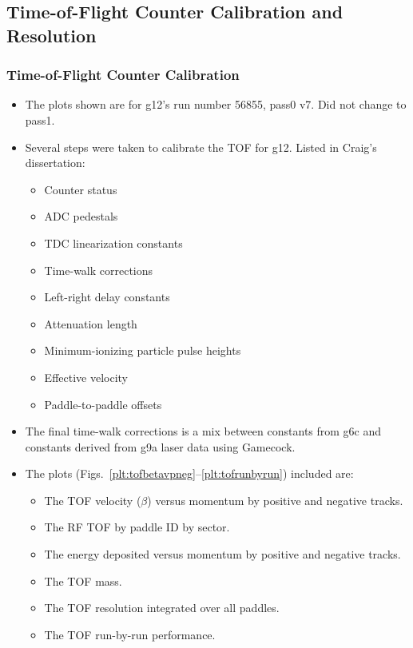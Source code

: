 \subsection{\label{sec:calib.tof}Time-of-Flight Counter Calibration and Resolution}

\subsubsection{\label{sec:calib.tof.calib}Time-of-Flight Counter Calibration}

\begin{itemize}
    \item The plots shown are for g12's run number 56855, pass0 v7. Did not change to pass1.
    \item Several steps were taken to calibrate the TOF for g12. Listed in Craig's dissertation\cite{clas.thesis.bookwalter}:
    \begin{itemize}
        \item Counter status
        \item ADC pedestals
        \item TDC linearization constants
        \item Time-walk corrections
        \item Left-right delay constants
        \item Attenuation length
        \item Minimum-ionizing particle pulse heights
        \item Effective velocity
        \item Paddle-to-paddle offsets
    \end{itemize}
    \item The final time-walk corrections is a mix between constants from g6c and constants derived from g9a laser data using Gamecock.
    \item The plots (Figs.~\ref{plt:tofbetavpneg}--\ref{plt:tofrunbyrun}) included are:
    \begin{itemize}
        \item The TOF velocity ($\beta$) versus momentum by positive and negative tracks.
        \item The RF TOF by paddle ID by sector.
        \item The energy deposited versus momentum by positive and negative tracks.
        \item The TOF mass.
        \item The TOF resolution integrated over all paddles.
        \item The TOF run-by-run performance.
    \end{itemize}
\end{itemize}

